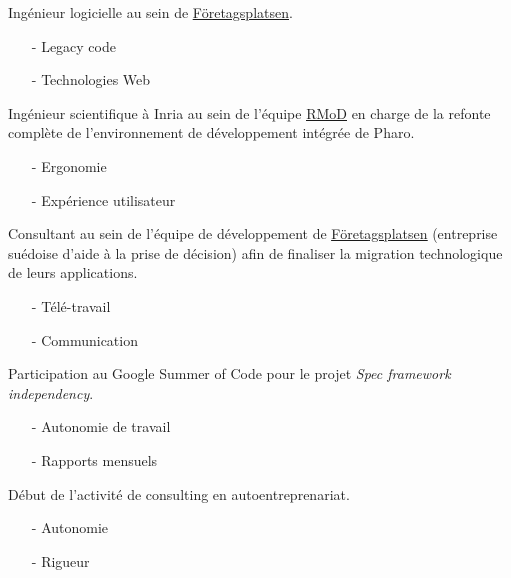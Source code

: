 \continuedname{}
\begin{rubric}{%
}


\entry*[15/07/2014]
Ingénieur logicielle au sein de \href{http://www.foretagsplatsen.se/}{\underline{Företagsplatsen}}.
\begin{itemize}
	\item[- ] Legacy code
	\item[- ] Technologies Web
\end{itemize}

\entry*[01/07/2013 - 31/08/2013]
Ingénieur scientifique à Inria au sein de l'équipe \href{http://rmod.inria.fr/}{\underline{RMoD}} en charge de la refonte complète de l'environnement de développement intégrée de Pharo.
\begin{itemize}
	\item[- ] Ergonomie
	\item[- ] Expérience utilisateur
\end{itemize}

\entry*[01/06/2013 - 30/06/2014]
Consultant au sein de l'équipe de développement de \href{http://www.foretagsplatsen.se/}{\underline{Företagsplatsen}} (entreprise suédoise d'aide à la prise de décision) afin de finaliser la migration technologique de leurs applications.
\begin{itemize}
	\item[- ] Télé-travail
	\item[- ] Communication
\end{itemize}

\entry*[01/06/2013 - 31/08/2013]
Participation au Google Summer of Code pour le projet \emph{Spec framework independency}.
\begin{itemize}
	\item[- ] Autonomie de travail
	\item[- ] Rapports mensuels
\end{itemize}

\entry*[01/06/2013]
Début de l'activité de consulting en autoentreprenariat.
\begin{itemize}
	\item[- ] Autonomie
	\item[- ] Rigueur
\end{itemize}


\end{rubric}
